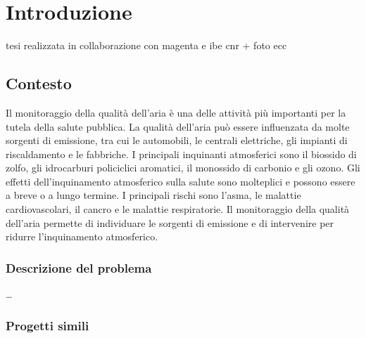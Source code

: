 \chapter{Introduzione}\label{ch:introduzione}
tesi realizzata in collaborazione con magenta e ibe cnr + foto ecc

\section{Contesto}\label{sec:contesto}


Il monitoraggio della qualità dell'aria è una delle attività più importanti per la tutela della salute pubblica. La qualità dell'aria può essere influenzata da molte sorgenti di emissione, tra cui le automobili, le centrali elettriche, gli impianti di riscaldamento e le fabbriche. I principali inquinanti atmosferici sono il biossido di zolfo, gli idrocarburi policiclici aromatici, il monossido di carbonio e gli ozono. Gli effetti dell'inquinamento atmosferico sulla salute sono molteplici e possono essere a breve o a lungo termine. I principali rischi sono l'asma, le malattie cardiovascolari, il cancro e le malattie respiratorie. Il monitoraggio della qualità dell'aria permette di individuare le sorgenti di emissione e di intervenire per ridurre l'inquinamento atmosferico.

\subsection{Descrizione del problema}\label{ssec:problema}
\ldots

\subsection{Progetti simili}\label{ssec:competitor}

